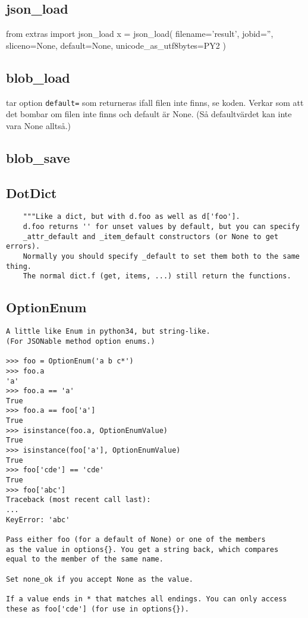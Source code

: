 \subsection{json\_load}
\begin{python}
from extras import json_load
x = json_load(
    filename='result',
    jobid='',
    sliceno=None,
    default=None,
    unicode_as_utf8bytes=PY2
)
\end{python}


\subsection{blob\_load}
tar option \texttt{default=} som returneras ifall filen inte finns,
se koden.  Verkar som att det bombar om filen inte finns och default är None.
(Så defaultvärdet kan inte vara None alltså.)


\subsection{blob\_save}





\subsection{DotDict}
\begin{verbatim}
    """Like a dict, but with d.foo as well as d['foo'].
    d.foo returns '' for unset values by default, but you can specify
    _attr_default and _item_default constructors (or None to get errors).
    Normally you should specify _default to set them both to the same thing.
    The normal dict.f (get, items, ...) still return the functions.
\end{verbatim}




\subsection{OptionEnum}
\begin{verbatim}
A little like Enum in python34, but string-like.
(For JSONable method option enums.)

>>> foo = OptionEnum('a b c*')
>>> foo.a
'a'
>>> foo.a == 'a'
True
>>> foo.a == foo['a']
True
>>> isinstance(foo.a, OptionEnumValue)
True
>>> isinstance(foo['a'], OptionEnumValue)
True
>>> foo['cde'] == 'cde'
True
>>> foo['abc']
Traceback (most recent call last):
...
KeyError: 'abc'

Pass either foo (for a default of None) or one of the members
as the value in options{}. You get a string back, which compares
equal to the member of the same name.

Set none_ok if you accept None as the value.

If a value ends in * that matches all endings. You can only access
these as foo['cde'] (for use in options{}).
\end{verbatim}



